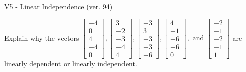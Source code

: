 \begin{exercise}
  \begin{exerciseTitle}V5 - Linear Independence (ver. 94)\end{exerciseTitle}
  \begin{exerciseStatement}
    Explain why the vectors \(\left[\begin{array}{r}
-4 \\
0 \\
4 \\
-4 \\
0
\end{array}\right] , \left[\begin{array}{r}
3 \\
-2 \\
-3 \\
-4 \\
4
\end{array}\right] , \left[\begin{array}{r}
-3 \\
3 \\
-3 \\
-3 \\
-6
\end{array}\right] , \left[\begin{array}{r}
4 \\
-1 \\
-6 \\
-6 \\
0
\end{array}\right] , \text{ and } \left[\begin{array}{r}
-2 \\
-1 \\
-2 \\
-1 \\
1
\end{array}\right]\) are linearly dependent or linearly independent.	



\end{exerciseStatement}
\end{exercise}
